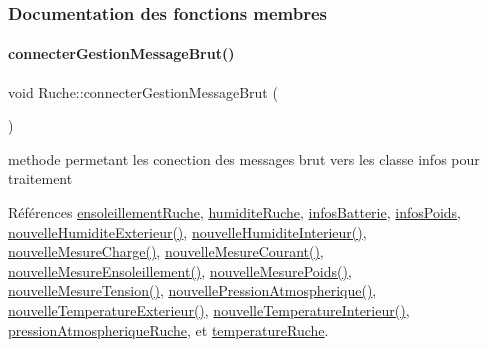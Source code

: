 \subsubsection{Documentation des fonctions membres}
\mbox{\label{class_ruche_a9c8e7e3b529676c6dda3d936370af00f}} 
\paragraph{\texorpdfstring{connecter\+Gestion\+Message\+Brut()}{connecterGestionMessageBrut()}}
{\footnotesize\ttfamily void Ruche\+::connecter\+Gestion\+Message\+Brut (\begin{DoxyParamCaption}{ }\end{DoxyParamCaption})\hspace{0.3cm}{\ttfamily [private]}}

methode permetant les conection des messages brut vers les classe infos pour traitement 

Références \hyperlink{class_ruche_a197003ecff4f029885c7d38569a68d49}{ensoleillement\+Ruche}, \hyperlink{class_ruche_acb380928928e693a1933c4cf607ddf80}{humidite\+Ruche}, \hyperlink{class_ruche_af34340e456aff54c8d1ec433fdbe0740}{infos\+Batterie}, \hyperlink{class_ruche_af3d02b62dd3d986b73b38851bb88ec77}{infos\+Poids}, \hyperlink{class_ruche_af88c6ed0320bfe45d5b15faa936caf4d}{nouvelle\+Humidite\+Exterieur()}, \hyperlink{class_ruche_a1d5094246e935d8ae5b9f08c9d042247}{nouvelle\+Humidite\+Interieur()}, \hyperlink{class_ruche_a49ac0c627ecac39c969403db1495711f}{nouvelle\+Mesure\+Charge()}, \hyperlink{class_ruche_a46d8191444302b02a52d1128c5650730}{nouvelle\+Mesure\+Courant()}, \hyperlink{class_ruche_aa9eaf4dd1b60e525c7d1bb5319130ce1}{nouvelle\+Mesure\+Ensoleillement()}, \hyperlink{class_ruche_abe5e5d4f4070766d5295d4dc6e0ce03c}{nouvelle\+Mesure\+Poids()}, \hyperlink{class_ruche_aa3fd352b343fcf780787aeb7e42935ef}{nouvelle\+Mesure\+Tension()}, \hyperlink{class_ruche_ae72c86953df530bc5d3901ba66cf884d}{nouvelle\+Pression\+Atmospherique()}, \hyperlink{class_ruche_aa8d28f554cd485c32d348a9147d2e236}{nouvelle\+Temperature\+Exterieur()}, \hyperlink{class_ruche_ac4d6e0c0db4b5c992606bff88759b2c3}{nouvelle\+Temperature\+Interieur()}, \hyperlink{class_ruche_a06efa82900dc7e31ed67c826d3157ae0}{pression\+Atmospherique\+Ruche}, et \hyperlink{class_ruche_af721fb92f801a9b1f3ef3aa9867cf3de}{temperature\+Ruche}.



